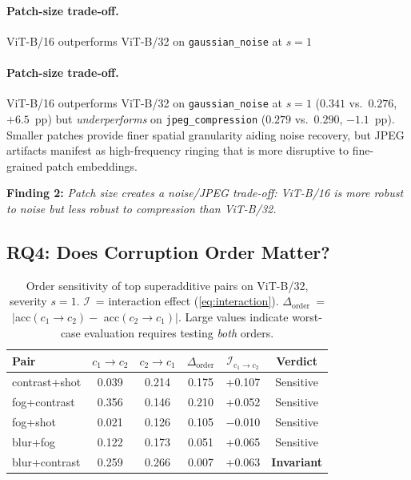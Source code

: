 \documentclass[10pt, twocolumn]{article}
\newcommand{\cI}{\mathcal{I}}          %
\begin{document}
\paragraph{Patch-size trade-off.}
ViT-B/16 outperforms ViT-B/32 on
\texttt{gaussian\_noise} at $s=1$
\paragraph{Patch-size trade-off.}
ViT-B/16 outperforms ViT-B/32 on
\texttt{gaussian\_noise} at $s=1$
($0.341$ vs.\ $0.276$, $+6.5$~pp) but
\emph{underperforms} on \texttt{jpeg\_compression}
($0.279$ vs.\ $0.290$, $-1.1$~pp).
Smaller patches provide finer spatial granularity
aiding noise recovery, but JPEG artifacts manifest
as high-frequency ringing that is more disruptive
to fine-grained patch embeddings.

\noindent\textbf{Finding 2:}
\textit{Patch size creates a noise/JPEG trade-off:
ViT-B/16 is more robust to noise but less robust
to compression than ViT-B/32.}

\subsection{RQ4: Does Corruption Order Matter?}
\label{sec:rq4}

\begin{table}[t]
\caption{
  Order sensitivity of top superadditive pairs on
  ViT-B/32, severity $s=1$.
  $\cI$~= interaction effect (\cref{eq:interaction}).
  $\Delta_{\mathrm{order}}$~= $|$acc$(c_1{\to}c_2)
  -$ acc$(c_2{\to}c_1)|$.
  Large values indicate worst-case evaluation
  requires testing \emph{both} orders.
}
\label{tab:ablation}
\centering
\small
\setlength{\tabcolsep}{3pt}
\begin{tabular}{lccccc}
\toprule
\textbf{Pair}
  & \textbf{$c_1{\to}c_2$}
  & \textbf{$c_2{\to}c_1$}
  & $\Delta_{\mathrm{order}}$
  & $\cI_{c_1 \to c_2}$
  & \textbf{Verdict} \\
\midrule
contrast+shot & 0.039 & 0.214 & 0.175
  & +0.107 & Sensitive \\
fog+contrast  & 0.356 & 0.146 & 0.210
  & +0.052 & Sensitive \\
fog+shot      & 0.021 & 0.126 & 0.105
  & $-$0.010 & Sensitive \\
blur+fog      & 0.122 & 0.173 & 0.051
  & +0.065 & Sensitive \\
blur+contrast & 0.259 & 0.266 & 0.007
  & +0.063 & \textbf{Invariant} \\
\bottomrule
\end{tabular}
\end{table}
\end{document}
